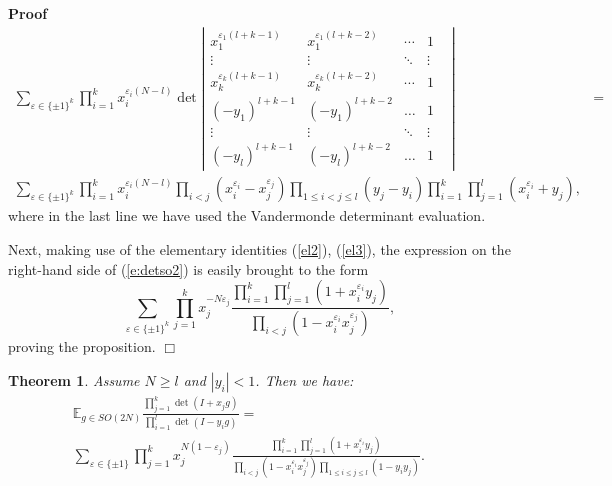 \documentclass[11pt]{amsart}
\renewenvironment{proof}{
\noindent\textbf{Proof}\ }{\hspace*{\fill}
\begin{math}\Box\end{math}\medskip}
\newtheorem{theorem}{Theorem}
\begin{document}
\begin{proof}
\begin{eqnarray*}
    \sum_{\varepsilon \in \{ \pm 1 \}^k} \prod_{i = 1}^k x_i^{\varepsilon_i (
    N - l )} \det \left| \begin{array}{ccccc}
      x_1^{\varepsilon_1 ( l + k - 1 )} & x_1^{\varepsilon_1 ( l + k - 2 )}& \cdots
      & 1 &
      \\
      \vdots & \vdots & \ddots & \vdots & \\
      x_k^{\varepsilon_k ( l + k - 1 )} & x_k^{\varepsilon_k ( l + k - 2 )} & \cdots & 1 &
      \\
      (-y_1)^{l+k-1} &  (-y_1)^{l+k-2}& \dots & 1 &\\
\vdots & \vdots &\ddots & \vdots & \\
(-y_l)^{l+k-1} &  (-y_l)^{l+k-2}& \dots & 1 &
    \end{array} \right| & = & \\
    \sum_{\varepsilon \in \{ \pm 1 \}^k} \prod_{i = 1}^k x_i^{\varepsilon_i (
    N - l )} \prod_{i < j} ( x_i^{\varepsilon_i} - x_j^{\varepsilon_j} )
    \prod_{1 \leqslant i < j \leqslant l} ( y_j - y_i ) \prod_{i = 1}^k
    \prod_{j = 1}^l ( x_i^{\varepsilon_i} + y_j ), &  &
  \end{eqnarray*}
  where in the last line we have used the Vandermonde determinant evaluation.

  Next, making use of the elementary identities (\ref{el2}), (\ref{el3}), the
  expression on the right-hand side of (\ref{e:detso2}) is easily brought to
  the form
  \[ \sum_{\varepsilon \in \{ \pm 1 \}^k} \prod_{j = 1}^k x_j^{- N
     \varepsilon_j} \frac{\prod_{i = 1}^k \prod_{j = 1}^l ( 1 +
     x_i^{\varepsilon_i} y_j )}{\prod_{i < j} ( 1 - x_i^{\varepsilon_i}
     x_j^{\varepsilon_j} )}, \]
  proving the proposition.
\end{proof}

\begin{theorem}
  \label{ratso}Assume $N \geqslant l$ and $|y_i| <1$. Then we
  have:
  \begin{eqnarray*}
    \mathbb{E}_{g \in SO ( 2 N )} \frac{\prod_{j = 1}^k \det ( I + x_j g
    )}{\prod_{i = 1}^l \det ( I - y_i g )} = & &\\
    \sum_{\varepsilon \in \{ \pm 1 \}} \prod_{j = 1}^k x_j^{N ( 1 -
    \varepsilon_j )} \frac{\prod_{i = 1}^k \prod_{j = 1}^l ( 1 +
    x_i^{\varepsilon_i} y_j )}{\prod_{i < j} ( 1 - x_i^{\varepsilon_i}
    x_j^{\varepsilon_j} ) \prod_{1 \leqslant i \leqslant j \leqslant l} ( 1 -
    y_i y_j )} . & &
  \end{eqnarray*}

\end{theorem}
\end{document}
